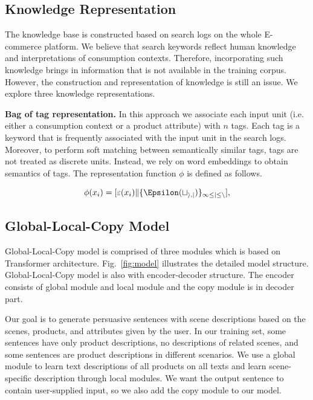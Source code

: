 \documentclass[sigconf]{acmart}
\begin{document}
\subsection{Knowledge Representation}\label{sec:knowledge}

The knowledge base is constructed based on search logs on the whole E-commerce platform. We believe that search keywords reflect human knowledge and interpretations of consumption contexts. Therefore, incorporating such knowledge brings in information that is not available in the training corpus. However, the construction and representation of knowledge is still an issue. We explore three knowledge representations.

\textbf{Bag of tag representation.} In this approach we associate each input unit (i.e. either a consumption context or a product attribute) with $n$ tags. Each tag is a keyword that is frequently associated with the input unit in the search logs. Moreover, to perform soft matching between semantically similar tags, tags are not treated as discrete units. Instead, we rely on word embeddings to obtain semantics of tags. The representation function $\phi$ is defined as follows.



\begin{equation}
\phi(x_i) = [\varepsilon (x_i)\|\{\mathcal{\Epsilon(t_{i,j})\}_{1\leq j \leq n}}],
\end{equation}


\subsection{Global-Local-Copy Model}\label{sec:global}
Global-Local-Copy model is comprised of three modules which is based on Transformer architecture. Fig.~\ref{fig:model} illustrates the detailed model structure. Global-Local-Copy model is also with encoder-decoder structure. The encoder consists of global module and local module and the copy module is in decoder part. 

Our goal is to generate persuasive sentences with scene descriptions based on the scenes, products, and attributes given by the user. In our training set, some sentences have only product descriptions, no descriptions of related scenes, and some sentences are product descriptions in different scenarios. We use a global module to learn text descriptions of all products on all texts and learn scene-specific description through local modules. We want the output sentence to contain user-supplied input, so we also add the copy module to our model.
\end{document}
